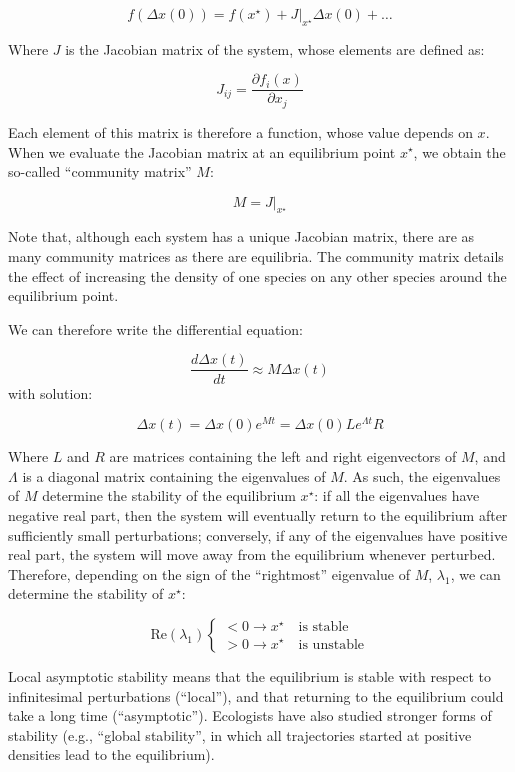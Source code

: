 \documentclass[]{book}
\begin{document}
\[
f(\Delta x(0)) = f(x^\star)+ \left. J \right|_{x^\star} \Delta x(0) + \ldots
\]

Where \(J\) is the Jacobian matrix of the system, whose elements are defined as:

\[
J_{ij} = \frac{\partial f_i({x})}{\partial x_j} 
\]

Each element of this matrix is therefore a function, whose value depends on \({x}\). When we evaluate the Jacobian matrix at an equilibrium point \({x}^\star\), we obtain the so-called ``community matrix'' \({M}\):

\[
  M = \left. {J} \right|_{ {x}^\star}
\]

Note that, although each system has a unique Jacobian matrix, there are as many community matrices as there are equilibria. The community matrix details the effect of increasing the density of one species on any other species around the equilibrium point.

We can therefore write the differential equation:

\[
\frac{d \Delta x(t)}{dt} \approx M \Delta x(t)
\]
with solution:

\[
\Delta x(t) = \Delta x(0) e^{Mt} = \Delta x(0) L e^{\Lambda t} R
\]

Where \(L\) and \(R\) are matrices containing the left and right eigenvectors of \(M\), and \(\Lambda\) is a diagonal matrix containing the eigenvalues of \(M\). As such, the eigenvalues of \(M\) determine the stability of the equilibrium \({x}^\star\): if all the eigenvalues have negative real part, then the system will eventually return to the equilibrium after sufficiently small perturbations; conversely, if any of the eigenvalues have positive real part, the system will move away from the equilibrium whenever perturbed. Therefore, depending on the sign of the ``rightmost'' eigenvalue of \({M}\), \(\lambda_1\), we can determine the stability of \({x}^\star\):

\[
  \text{Re}(\lambda_1) \begin{cases}
    < 0 \to {x}^\star \quad \text{is stable}\\
    > 0 \to {x}^\star \quad \text{is unstable}
  \end{cases}
\]

Local asymptotic stability means that the equilibrium is stable with respect to infinitesimal perturbations (``local''), and that returning to the equilibrium could take a long time (``asymptotic''). Ecologists have also studied stronger forms of stability (e.g., ``global stability'', in which all trajectories started at positive densities lead to the equilibrium).
\end{document}
